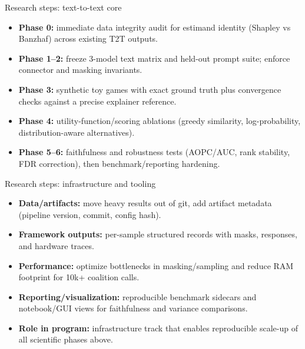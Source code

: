 \documentclass[aspectratio=169]{beamer}
\begin{document}
\begin{frame}{Research steps: text-to-text core}
  \begin{itemize}
    \item \textbf{Phase 0:} immediate data integrity audit for estimand identity (Shapley vs Banzhaf) across existing T2T outputs.
    \item \textbf{Phase 1--2:} freeze 3-model text matrix and held-out prompt suite; enforce connector and masking invariants.
    \item \textbf{Phase 3:} synthetic toy games with exact ground truth plus convergence checks against a precise explainer reference.
    \item \textbf{Phase 4:} utility-function/scoring ablations (greedy similarity, log-probability, distribution-aware alternatives).
    \item \textbf{Phase 5--6:} faithfulness and robustness tests (AOPC/AUC, rank stability, FDR correction), then benchmark/reporting hardening.
  \end{itemize}
\end{frame}

\begin{frame}{Research steps: infrastructure and tooling}
  \begin{itemize}
    \item \textbf{Data/artifacts:} move heavy results out of git, add artifact metadata (pipeline version, commit, config hash).
    \item \textbf{Framework outputs:} per-sample structured records with masks, responses, and hardware traces.
    \item \textbf{Performance:} optimize bottlenecks in masking/sampling and reduce RAM footprint for 10k+ coalition calls.
    \item \textbf{Reporting/visualization:} reproducible benchmark sidecars and notebook/GUI views for faithfulness and variance comparisons.
    \item \textbf{Role in program:} infrastructure track that enables reproducible scale-up of all scientific phases above.
  \end{itemize}
\end{frame}
\end{document}
